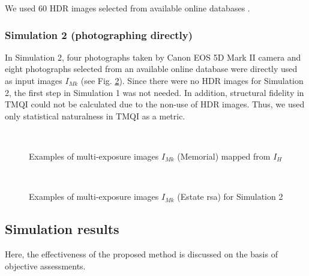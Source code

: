 \documentclass[paper]{ieice}
\begin{document}
  We used 60 HDR images selected from available online databases
  \cite{openexrimage,anyherehdrimage}.
%
  \subsubsection{Simulation 2 (photographing directly)}
  In Simulation 2, four photographs taken by Canon EOS 5D Mark II camera
  and eight photographs selected from an available online database \cite{easyhdr}
  were directly used as input images $I_{Mk}$
  (see Fig. \ref{fig:estate}).
  Since there were no HDR images for Simulation 2,
  the first step in Simulation 1 was not needed.
  In addition, structural fidelity in TMQI could not be calculated
  due to the non-use of HDR images.
  Thus, we used only statistical naturalness in TMQI as a metric.
%
\begin{figure}[!t]
  \centering
  \\
  \caption{Examples of multi-exposure images $I_{Mk}$ (Memorial) mapped from $I_H$}
  \label{fig:orgImages}
\end{figure}
%
\begin{figure}[!t]
  \centering
  \\
  \caption{Examples of multi-exposure images $I_{Mk}$ (Estate rsa) for Simulation 2}
  \label{fig:estate}
\end{figure}
%
\subsection{Simulation results}
  Here, the effectiveness of the proposed method is discussed
  on the basis of objective assessments.
%
\end{document}
